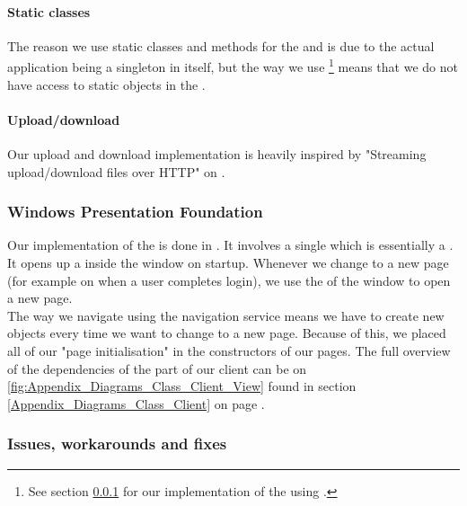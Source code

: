 \paragraph{Static classes}
The reason we use static classes and methods for the  and  is due to the actual application being a singleton in itself, but the way we use \footnote{See section \ref{Implementation_Client_Architecture_WPF} for our implementation of the  using .} means that we do not have access to static objects in the .

\paragraph{Upload/download} Our upload and download implementation is heavily inspired by "Streaming upload/download files over HTTP" on \cite{CODE:UPLDL}. 

\subsubsection{Windows Presentation Foundation}
\label{Implementation_Client_Architecture_WPF}
Our implementation of the  is done in . It involves a single  which is essentially a  . It opens up a  inside the window on startup. Whenever we change to a new page (for example on when a user completes login), we use the  of the window to open a new page.
\\The way we navigate using the navigation service means we have to create new  objects every time we want to change to a new page. Because of this, we placed all of our "page initialisation" in the constructors of our pages. The full overview of the dependencies of the  part of our client can be on \ref{fig:Appendix_Diagrams_Class_Client_View} found in section \ref{Appendix_Diagrams_Class_Client} on page \pageref{Appendix_Diagrams_Class_Client}.

\subsubsection{Issues, workarounds and fixes}
\label{Implementation_Client_Architecture_Issues}

